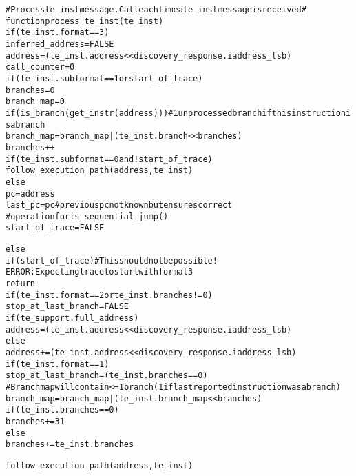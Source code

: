 \begin{alltt}
# Process te_inst message.  Call each time a te_inst message is received #
function process_te_inst (te_inst)
  if (te_inst.format == 3)
    inferred_address = FALSE
    address       = (te_inst.address << discovery_response.iaddress_lsb)
    call_counter  = 0
    if (te_inst.subformat == 1 or start_of_trace)
      branches    = 0
      branch_map  = 0
    if (is_branch(get_instr(address))) # 1 unprocessed branch if this instruction is a branch
      branch_map = branch_map | (te_inst.branch << branches)
      branches++
    if (te_inst.subformat == 0 and !start_of_trace)
      follow_execution_path(address, te_inst)
    else
      pc           = address
      last_pc      = pc # previous pc not known but ensures correct
                        #  operation for is_sequential_jump()
    start_of_trace = FALSE

  else
    if (start_of_trace) # This should not be possible!
      ERROR: Expecting trace to start with format 3
      return
    if (te_inst.format == 2 or te_inst.branches != 0)
      stop_at_last_branch = FALSE
      if (te_support.full_address)
        address  = (te_inst.address << discovery_response.iaddress_lsb)
      else
        address += (te_inst.address << discovery_response.iaddress_lsb)
    if (te_inst.format == 1)
      stop_at_last_branch = (te_inst.branches == 0)
      # Branch map will contain <= 1 branch (1 if last reported instruction was a branch)
      branch_map = branch_map | (te_inst.branch_map << branches)
      if (te_inst.branches == 0)
        branches += 31
      else
        branches += te_inst.branches

    follow_execution_path(address, te_inst)
\end{alltt}

\pagebreak

